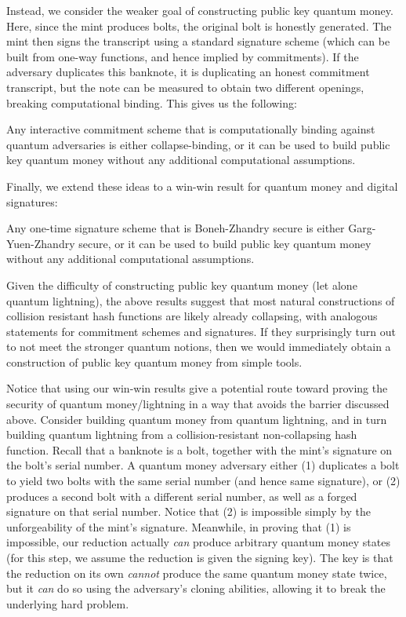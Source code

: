 Instead, we consider the weaker goal of constructing public key quantum money.  Here, since the mint produces bolts, the original bolt is honestly generated.  The mint then signs the transcript using a standard signature scheme (which can be built from one-way functions, and hence implied by commitments).  If the adversary duplicates this banknote, it is duplicating an honest commitment transcript, but the note can be measured to obtain two different openings, breaking computational binding.  This gives us the following:

\begin{theorem}[informal] Any interactive commitment scheme that is computationally binding against quantum adversaries is either collapse-binding, or it can be used to build public key quantum money without any additional computational assumptions.
\end{theorem}

\noindent Finally, we extend these ideas to a win-win result for quantum money and digital signatures:

\begin{theorem}[informal] Any one-time signature scheme that is Boneh-Zhandry secure is either Garg-Yuen-Zhandry secure, or it can be used to build public key quantum money without any additional computational assumptions.
\end{theorem}

Given the difficulty of constructing public key quantum money (let alone quantum lightning), the above results suggest that most natural constructions of collision resistant hash functions are likely already collapsing, with analogous statements for commitment schemes and signatures.  If they surprisingly turn out to not meet the stronger quantum notions, then we would immediately obtain a construction of public key quantum money from simple tools.

\medskip

Notice that using our win-win results give a potential route toward proving the security of quantum money/lightning in a way that avoids the barrier discussed above.  Consider building quantum money from quantum lightning, and in turn building quantum lightning from a collision-resistant non-collapsing hash function.  Recall that a banknote is a bolt, together with the mint's signature on the bolt's serial number.  A quantum money adversary either (1) duplicates a bolt to yield two bolts with the same serial number (and hence same signature), or (2) produces a second bolt with a different serial number, as well as a forged signature on that serial number.  Notice that (2) is impossible simply by the unforgeability of the mint's signature.  Meanwhile, in proving that (1) is impossible, our reduction actually \emph{can} produce arbitrary quantum money states (for this step, we assume the reduction is given the signing key).  The key is that the reduction on its own \emph{cannot} produce the same quantum money state twice, but it \emph{can} do so using the adversary's cloning abilities, allowing it to break the underlying hard problem.



